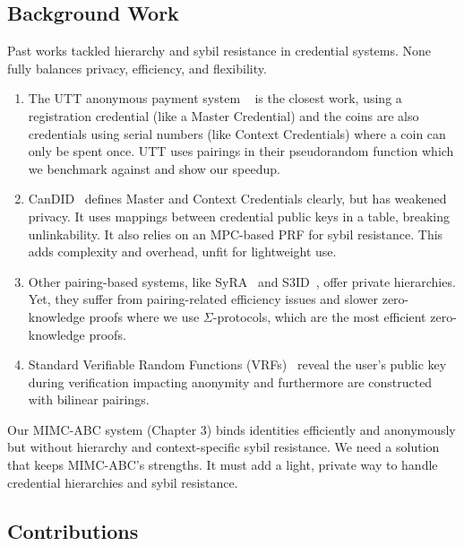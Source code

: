 \subsection{Background Work}

Past works tackled hierarchy and sybil resistance in credential systems. None fully balances privacy, efficiency, and flexibility. 
\begin{enumerate}
    \item The UTT anonymous payment system ~\cite{tomescu2022utt} is the closest work, using a registration credential (like a Master Credential) and the coins are also credentials using serial numbers (like Context Credentials) where a coin can only be spent once. UTT uses pairings in their pseudorandom function which we benchmark against and show our speedup.

    \item CanDID~\cite{maram2021candid} defines Master and Context Credentials clearly, but has weakened privacy. It uses mappings between credential public keys in a table, breaking unlinkability. It also relies on an MPC-based PRF for sybil resistance. This adds complexity and overhead, unfit for lightweight use.

    \item Other pairing-based systems, like SyRA~\cite{crites_syra_2024} and S3ID~\cite{rabaninejad_attribute-based_2024}, offer private hierarchies. Yet, they suffer from pairing-related efficiency issues and slower zero-knowledge proofs where we use $\Sigma$-protocols, which are the most efficient zero-knowledge proofs.

    \item Standard Verifiable Random Functions  (VRFs)~\cite{hutchison_verifiable_2005} reveal the user’s public key during verification impacting anonymity and furthermore are constructed with bilinear pairings.

\end{enumerate}

Our MIMC-ABC system (Chapter 3) binds identities efficiently and anonymously but without hierarchy and context-specific sybil resistance. We need a solution that keeps MIMC-ABC’s strengths. It must add a light, private way to handle credential hierarchies and sybil resistance.




\subsection{Contributions}


